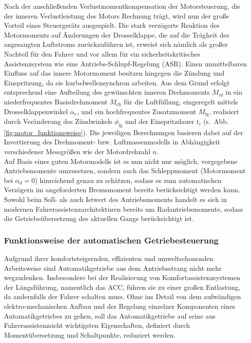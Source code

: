 Nach der anschließenden Verlustmomentkompensation der Motorsteuerung, die der inneren Verlustleistung des Motors Rechnung trägt, wird nun der große Vorteil eines Steuergeräts ausgespielt. Die stark verzögerte Reaktion des Motormoments auf Änderungen der Drosselklappe, die auf die Trägheit des angesaugten Luftstroms zurückzuführen ist, erweist sich nämlich als großer Nachteil für den Fahrer und vor allem für ein sicherheitskritisches Assistenzsystem wie eine Antriebs-Schlupf-Regelung (ASR). Einen unmittelbaren Einfluss auf das innere Motormoment besitzen hingegen die Zündung und Einspritzung, da sie kurbelwellensynchron arbeiten. Aus dem Grund erfolgt entsprechend  eine Aufteilung des gewünschten inneren Drehmoments  $M_{id}$ in ein niederfrequentes Basisdrehmoment $M_\text{ch}$ für die Luftfüllung, eingeregelt mittels Drosselklappenwinkel $\alpha_e$, und ein hochfrequentes Zusatzmoment $M_\text{ig}$, realisiert durch Veränderung des Zündwinkels $\phi_\text{ig}$ und der Einspritzdauer $t_i$ (s.\ Abb.\,\ref{fig:motor_funktionsweise}). Die jeweiligen Berechnungen basieren dabei auf der Invertierung des Drehmoment- bzw. Luftmassenmodells in Abhängigkeit verschiedener Messgrößen wie der Motordrehzahl $n$. \\
Auf Basis eines guten Motormodells ist es nun nicht nur möglich, vorgegebene Antriebsmomente umzusetzen, sondern auch das Schleppmoment (Motormoment bei $\alpha_d=0$) hinreichend genau zu schätzen, sodass es zum automatischen Verzögern im angeforderten Bremsmoment bereits berücksichtigt werden kann. Sowohl beim Soll- als auch Istwert des Antriebsmoments handelt es sich in modernen Fahrerassistenzarchitekturen bereits
um Radantriebsmomente, sodass die Getriebeübersetzung des aktuellen Gangs berücksichtigt ist. %
%




\subsubsection{Funktionsweise der automatischen Getriebesteuerung} %
Aufgrund ihrer komfortsteigernden, effizienten und umweltschonenden Arbeitsweise sind Automatikgetriebe aus dem Antriebsstrang nicht mehr wegzudenken. Insbesondere bei der Realisierung von Komfortassistenzsystemen der Längsführung, namentlich das ACC, führen sie zu einer großen Entlastung, da andernfalls der Fahrer schalten muss.
Ohne ins Detail von dem aufwändigen elektro-mechanischen Aufbau und der Regelung einzelner Komponenten eines Automatikgetriebes zu gehen, soll das Automatikgetriebe auf seine aus Fahrerassistenzsicht wichtigsten Eigenschaften, definiert durch Momentübersetzung und Schaltpunkte, reduziert werden.


